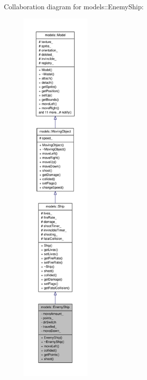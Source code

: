 \-Collaboration diagram for models\-:\-:\-Enemy\-Ship\-:
\nopagebreak
\begin{figure}[H]
\begin{center}
\leavevmode
\includegraphics[height=550pt]{db/dbd/classmodels_1_1EnemyShip__coll__graph}
\end{center}
\end{figure}
